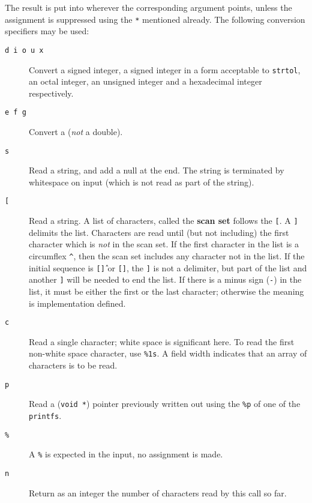    The result is put into wherever the corresponding argument points, unless
    the assignment is suppressed using the \texttt{*} mentioned already.
    The following conversion specifiers may be used:


   \begin{description}
    \item[\texttt{d i o u x}] Convert a signed integer, a signed integer in a form
     acceptable to \texttt{strtol}, an octal integer, an unsigned
     integer and a hexadecimal integer respectively.

    \item[\texttt{e f g}] Convert a \float{} (\textit{not} a double).

    \item[\texttt{s}] Read a string, and add a null at the end.  The string is
     terminated by whitespace on input (which is not read as
     part of the string).

   \item[\texttt{[}] Read a string.
     A list of characters, called the \textbf{scan set}
     follows the \texttt{[}. A \texttt{]} delimits the list. Characters
     are read until (but not including) the first character which is
     \textit{not} in the scan set.  If the first character in the list
     is a circumflex \texttt{\^}, then the scan set includes any
     character not in the list.  If the initial sequence is
     \texttt{[\^]} or \texttt{[]}, the \texttt{]} is not a
     delimiter, but part of the list and another \texttt{]} will be needed
     to end the list.  If there is a minus sign (\texttt{-}) in the list,
     it must be either the first or the last character; otherwise the meaning
     is implementation defined.

    \item[\texttt{c}] Read a single character; white space is significant here.
     To read the first non-white space character, use \texttt{\%1s}.  A
     field width indicates that an array of characters is to
     be read.

    \item[\texttt{p}] Read a (\texttt{void *}) pointer previously written out using
     the \texttt{\%p} of one of the \texttt{printfs}.

    \item[\texttt{\%}] A \texttt{\%} is expected in the input, no assignment is made.

    \item[\texttt{n}] Return as an integer the number of characters read by
     this call so far.
   \end{description}

